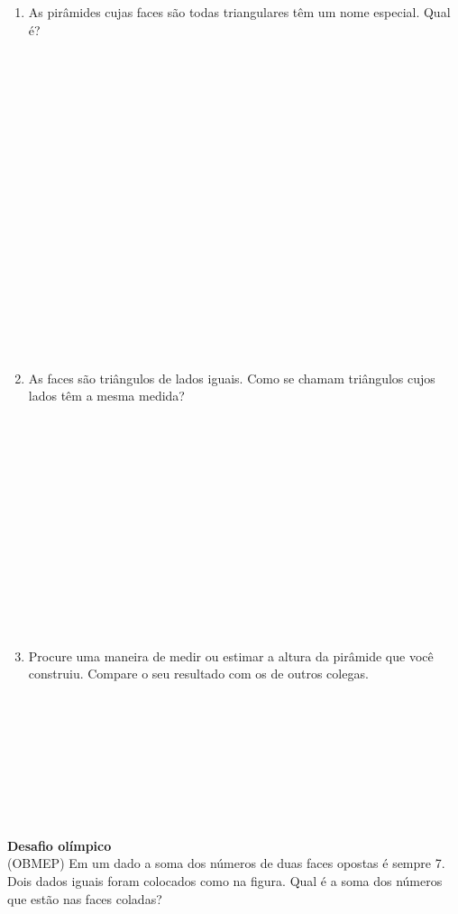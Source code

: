 \documentclass[a4paper,14pt]{article}
\begin{document}
\begin{multicols}{2}
\begin{enumerate}
        	\item As pirâmides cujas faces são todas triangulares têm um nome especial. Qual é? \\\\\\\\\\\\\\\\\\\\\\\\\\\\\\\\\\\\\\
        	\item As faces são triângulos de lados iguais. Como se chamam triângulos cujos lados têm a mesma medida? \\\\\\\\\\\\\\\\\\\\\\\\\\\\
        	\item Procure uma maneira de medir ou estimar a altura da pirâmide que você construiu. Compare o seu resultado com os de outros colegas. \\\\\\\\\\\\\\\\\\
        \end{enumerate}
    \textbf{Desafio olímpico}\\
    (OBMEP) Em um dado a soma dos números de duas faces opostas é sempre 7. Dois dados iguais foram colocados como na figura. Qual é a soma dos números que estão nas faces coladas?

\end{multicols}
\end{document}
